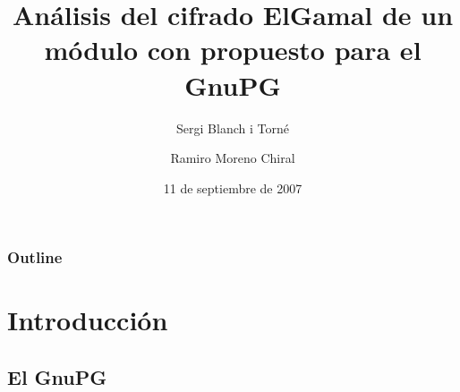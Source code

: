 \documentclass{beamer}
\title[An\'alisis de ElGamal con \ces{} para el GnuPG]{An\'alisis del cifrado ElGamal de un m\'odulo con \ces{} propuesto para el GnuPG}
\author[Sergi Blanch y Ramiro Moreno]{Sergi Blanch i Torn\'e \and Ramiro Moreno Chiral}
\institute[Universidad de Lleida]{Criptograf\'{\i}a y Grafos\\ Departamento de Matem\'aticas\\ Universidad de Lleida}
\date{11 de septiembre de 2007}
\newcommand{\version}[1]{\begin{center}{\footnotesize (Versi\'on #1)}\end{center}}
\theoremstyle{plain}        			%
\theoremstyle{definition}   			%
\theoremstyle{saltolinea}   			%
\begin{document}
\begin{frame}
  \titlepage
\end{frame}


\begin{frame}
\frametitle{Outline}
\tableofcontents[hideallsubsections]
\end{frame}



\section{Introducci\'on}

\subsection{El GnuPG}
\end{document}
